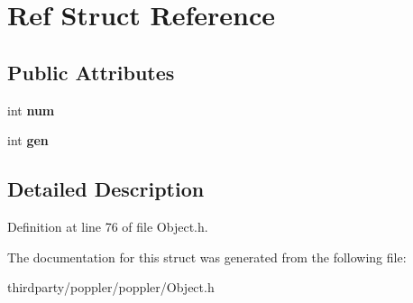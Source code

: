 \hypertarget{struct_ref}{}\section{Ref Struct Reference}
\label{struct_ref}
\subsection*{Public Attributes}
\begin{DoxyCompactItemize}
\item 
\mbox{\label{struct_ref_a75e5bf39e85713af6f448e83a896939a}} 
int {\bfseries num}
\item 
\mbox{\label{struct_ref_a1c94e17ecafe44aec621bd542b00cfda}} 
int {\bfseries gen}
\end{DoxyCompactItemize}


\subsection{Detailed Description}


Definition at line 76 of file Object.\+h.



The documentation for this struct was generated from the following file\+:\begin{DoxyCompactItemize}
\item 
thirdparty/poppler/poppler/Object.\+h\end{DoxyCompactItemize}
